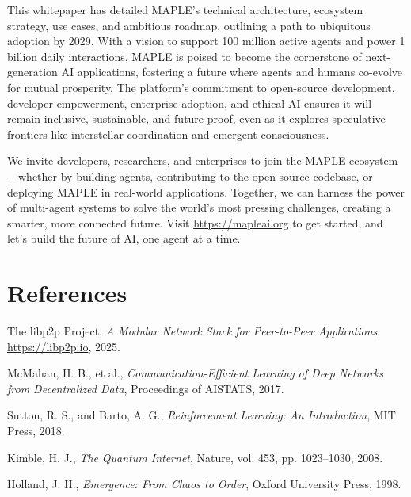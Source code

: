 \documentclass[a4paper,11pt]{article}
\begin{document}
This whitepaper has detailed MAPLE’s technical architecture, ecosystem strategy, use cases, and ambitious roadmap, outlining a path to ubiquitous adoption by 2029. With a vision to support 100 million active agents and power 1 billion daily interactions, MAPLE is poised to become the cornerstone of next-generation AI applications, fostering a future where agents and humans co-evolve for mutual prosperity. The platform’s commitment to open-source development, developer empowerment, enterprise adoption, and ethical AI ensures it will remain inclusive, sustainable, and future-proof, even as it explores speculative frontiers like interstellar coordination and emergent consciousness.

We invite developers, researchers, and enterprises to join the MAPLE ecosystem—whether by building agents, contributing to the open-source codebase, or deploying MAPLE in real-world applications. Together, we can harness the power of multi-agent systems to solve the world’s most pressing challenges, creating a smarter, more connected future. Visit \url{https://mapleai.org} to get started, and let’s build the future of AI, one agent at a time.

\pagebreak

\section{References}
\begin{thebibliography}{9}
    The libp2p Project, \emph{A Modular Network Stack for Peer-to-Peer Applications}, \url{https://libp2p.io}, 2025.

    McMahan, H. B., et al., \emph{Communication-Efficient Learning of Deep Networks from Decentralized Data}, Proceedings of AISTATS, 2017.

    Sutton, R. S., and Barto, A. G., \emph{Reinforcement Learning: An Introduction}, MIT Press, 2018.

    Kimble, H. J., \emph{The Quantum Internet}, Nature, vol. 453, pp. 1023–1030, 2008.

    Holland, J. H., \emph{Emergence: From Chaos to Order}, Oxford University Press, 1998.
\end{thebibliography}
\end{document}
